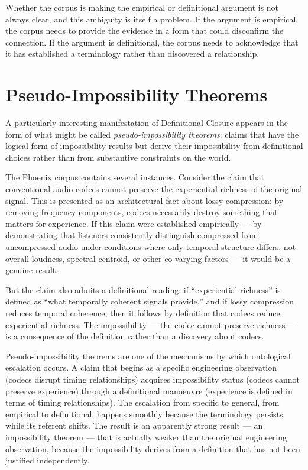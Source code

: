 Whether the corpus is making the empirical or definitional
argument is not always clear, and this ambiguity is itself
a problem. If the argument is empirical, the corpus needs
to provide the evidence in a form that could disconfirm
the connection. If the argument is definitional, the corpus
needs to acknowledge that it has established a terminology
rather than discovered a relationship.

\section{Pseudo-Impossibility Theorems}
\label{sec:pseudo-impossibility}

A particularly interesting manifestation of Definitional
Closure appears in the form of what might be called
\textit{pseudo-impossibility theorems}: claims that have
the logical form of impossibility results but derive their
impossibility from definitional choices rather than from
substantive constraints on the world.

The Phoenix corpus contains several instances. Consider
the claim that conventional audio codecs cannot preserve
the experiential richness of the original signal. This is
presented as an architectural fact about lossy compression:
by removing frequency components, codecs necessarily
destroy something that matters for experience. If this
claim were established empirically --- by demonstrating
that listeners consistently distinguish compressed from
uncompressed audio under conditions where only temporal
structure differs, not overall loudness, spectral centroid,
or other co-varying factors --- it would be a genuine
result.

But the claim also admits a definitional reading: if
``experiential richness'' is defined as ``what temporally
coherent signals provide,'' and if lossy compression
reduces temporal coherence, then it follows by definition
that codecs reduce experiential richness. The impossibility
--- the codec cannot preserve richness --- is a consequence
of the definition rather than a discovery about codecs.

\begin{dangerzone}
Pseudo-impossibility theorems are one of the mechanisms
by which ontological escalation occurs. A claim that
begins as a specific engineering observation (codecs
disrupt timing relationships) acquires impossibility
status (codecs cannot preserve experience) through a
definitional manoeuvre (experience is defined in terms
of timing relationships). The escalation from specific
to general, from empirical to definitional, happens
smoothly because the terminology persists while its
referent shifts. The result is an apparently strong result
--- an impossibility theorem --- that is actually weaker
than the original engineering observation, because the
impossibility derives from a definition that has not been
justified independently.
\end{dangerzone}

